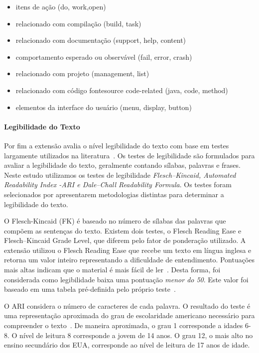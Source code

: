 \begin{itemize}

    \item itens de ação (do, work,open)
    \item relacionado com compilação (build, task)
    \item relacionado com documentação (support, help, content)
    \item comportamento esperado ou observável (fail, error, crash)
    \item relacionado com projeto (management, list)
    \item relacionado com código fontesource code-related (java, code, method)
    \item elementos da interface do usuário (menu, display, button)

\end{itemize}

\paragraph{Legibilidade do Texto}
\label{par:legibilidade_do_texto}

Por fim a extensão avalia o nível legibilidade do texto com base em testes
largamente utilizados na literatura~\cite{Si:2001:SMS:502585.502695}. Os testes
de legibilidade são formulados para avaliar a legibilidade do texto, geralmente
contando sílabas, palavras e frases.  Neste estudo utilizamos os testes de
legibilidade \textit{Flesch–Kincaid, Automated Readability Index \@-\@ ARI e
    Dale–Chall Readability Formula}. Os testes foram selecionados por
apresentarem metodologias distintas para determinar a legibilidade do texto.

O Flesch-Kincaid (FK) é baseado no número de sílabas das palavras que compõem as
sentenças do texto. Existem dois testes, o Flesch Reading Ease e Flesch–Kincaid
Grade Level, que diferem pelo fator de ponderação utilizado. A extensão utilizou
o Flesch Reading Ease que recebe um texto em língua inglesa e retorna um valor
inteiro representando a dificuldade de entendimento. Pontuações mais altas
indicam que o material é mais fácil de ler~\cite{kincaid1975derivation}. Desta
forma, foi considerada como legibilidade baixa uma pontuação \textit{menor do
    50}. Este valor foi baseado em uma tabela pré-definida pelo próprio
teste~\cite{kincaid1975derivation}.

O ARI considera o número de caracteres de cada palavra. O resultado do teste é
uma representação aproximada do grau de escolaridade americano necessário para
compreender o texto~\cite{senter1967automated}. De maneira aproximada, o grau 1
corresponde a idades 6\@-\@8. O nível de leitura 8 corresponde a jovem de 14
anos. O grau 12, o mais alto no ensino secundário dos EUA, corresponde ao nível
de leitura de 17 anos de idade.

